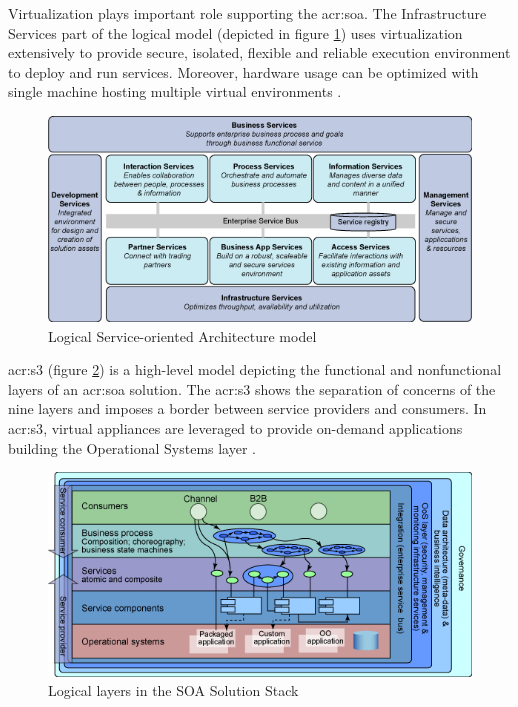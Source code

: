 \documentclass[11pt,openany]{book}
\begin{document}
        Virtualization plays important role supporting the \gls{acr:soa}. The Infrastructure Services part of the
        logical model (depicted in figure \ref{fig:ctx:soa-logical}) uses virtualization extensively to provide secure,
        isolated, flexible and reliable execution environment to deploy and run services. Moreover, hardware usage can
        be optimized with single machine hosting multiple virtual environments \cite{soa-foundation}.

        \begin{figure}[h]
          \begin{center}
            \includegraphics[scale=.5]{img/ctx/soa-logical.png}
          \end{center}


          \caption{Logical Service-oriented Architecture model}
          \label{fig:ctx:soa-logical}
        \end{figure}

        \gls{acr:s3} (figure \ref{fig:ctx:soa-stack}) is a high-level model depicting the functional and nonfunctional
        layers of an \gls{acr:soa} solution.  The \gls{acr:s3} shows the separation of concerns of the nine layers and
        imposes a border between service providers and consumers. In \gls{acr:s3}, virtual appliances are leveraged to
        provide on-demand applications building the Operational Systems layer \cite{soa-stack}.

        \begin{figure}[h]
          \begin{center}
            \includegraphics[scale=.5]{img/ctx/soa-stack.png}
          \end{center}


          \caption{Logical layers in the SOA Solution Stack}
          \label{fig:ctx:soa-stack}
        \end{figure}
\end{document}
